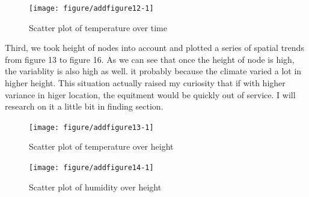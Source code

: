 \documentclass{article}\usepackage[]{graphicx}\usepackage[]{color}
\newenvironment{knitrout}{}{} %
\begin{document}
\begin{knitrout}
\color{fgcolor}\begin{figure}[h!]

{\centering \texttt{[image: figure/addfigure12-1]} 

}

\caption[Scatter plot of temperature over time]{Scatter plot of temperature over time}\label{fig:addfigure12}
\end{figure}


\end{knitrout}

Third, we took height of nodes into account and plotted a series of spatial trends from figure 13 to figure 16. As we can see that once the height of node is high, the variablity is also high as well. it probably because the climate varied a lot in higher height. This situation actually raised my curiosity that if with higher variance in higer location, the equitment would be quickly out of service. I will research on it a little bit in finding section.


\begin{knitrout}
\color{fgcolor}\begin{figure}[h!]

{\centering \texttt{[image: figure/addfigure13-1]} 

}

\caption[Scatter plot of temperature over height]{Scatter plot of temperature over height}\label{fig:addfigure13}
\end{figure}


\end{knitrout}

\begin{knitrout}
\color{fgcolor}\begin{figure}[h!]

{\centering \texttt{[image: figure/addfigure14-1]} 

}

\caption[Scatter plot of humidity over height]{Scatter plot of humidity over height}\label{fig:addfigure14}
\end{figure}


\end{knitrout}
\end{document}
